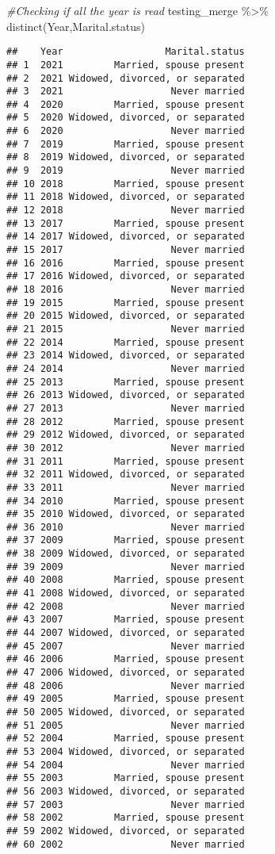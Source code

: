 \documentclass[
]{article}
\newenvironment{Shaded}{\begin{snugshade}}{\end{snugshade}}
\newcommand{\CommentTok}[1]{\textcolor[rgb]{0.56,0.35,0.01}{\textit{#1}}}
\newcommand{\FunctionTok}[1]{\textcolor[rgb]{0.00,0.00,0.00}{#1}}
\newcommand{\NormalTok}[1]{#1}
\newcommand{\SpecialCharTok}[1]{\textcolor[rgb]{0.00,0.00,0.00}{#1}}
\begin{document}
\begin{Shaded}
\begin{Highlighting}[]
\CommentTok{\#Checking if all the year is read}
\NormalTok{testing\_merge }\SpecialCharTok{\%\textgreater{}\%} \FunctionTok{distinct}\NormalTok{(Year,Marital.status)}
\end{Highlighting}
\end{Shaded}

\begin{verbatim}
##    Year                  Marital.status
## 1  2021         Married, spouse present
## 2  2021 Widowed, divorced, or separated
## 3  2021                   Never married
## 4  2020         Married, spouse present
## 5  2020 Widowed, divorced, or separated
## 6  2020                   Never married
## 7  2019         Married, spouse present
## 8  2019 Widowed, divorced, or separated
## 9  2019                   Never married
## 10 2018         Married, spouse present
## 11 2018 Widowed, divorced, or separated
## 12 2018                   Never married
## 13 2017         Married, spouse present
## 14 2017 Widowed, divorced, or separated
## 15 2017                   Never married
## 16 2016         Married, spouse present
## 17 2016 Widowed, divorced, or separated
## 18 2016                   Never married
## 19 2015         Married, spouse present
## 20 2015 Widowed, divorced, or separated
## 21 2015                   Never married
## 22 2014         Married, spouse present
## 23 2014 Widowed, divorced, or separated
## 24 2014                   Never married
## 25 2013         Married, spouse present
## 26 2013 Widowed, divorced, or separated
## 27 2013                   Never married
## 28 2012         Married, spouse present
## 29 2012 Widowed, divorced, or separated
## 30 2012                   Never married
## 31 2011         Married, spouse present
## 32 2011 Widowed, divorced, or separated
## 33 2011                   Never married
## 34 2010         Married, spouse present
## 35 2010 Widowed, divorced, or separated
## 36 2010                   Never married
## 37 2009         Married, spouse present
## 38 2009 Widowed, divorced, or separated
## 39 2009                   Never married
## 40 2008         Married, spouse present
## 41 2008 Widowed, divorced, or separated
## 42 2008                   Never married
## 43 2007         Married, spouse present
## 44 2007 Widowed, divorced, or separated
## 45 2007                   Never married
## 46 2006         Married, spouse present
## 47 2006 Widowed, divorced, or separated
## 48 2006                   Never married
## 49 2005         Married, spouse present
## 50 2005 Widowed, divorced, or separated
## 51 2005                   Never married
## 52 2004         Married, spouse present
## 53 2004 Widowed, divorced, or separated
## 54 2004                   Never married
## 55 2003         Married, spouse present
## 56 2003 Widowed, divorced, or separated
## 57 2003                   Never married
## 58 2002         Married, spouse present
## 59 2002 Widowed, divorced, or separated
## 60 2002                   Never married
\end{verbatim}
\end{document}
